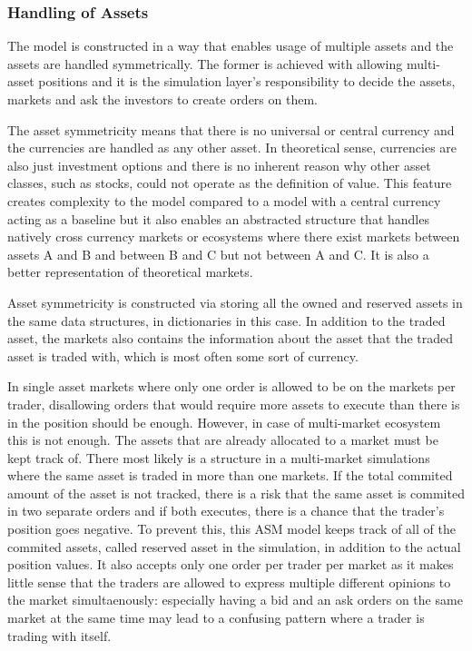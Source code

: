

\subsubsection{Handling of Assets}

The model is constructed in a way that enables usage of multiple assets
and the assets are handled symmetrically. The former is achieved with
allowing multi-asset positions and it is the simulation layer's 
responsibility to decide the assets, markets and ask the investors
to create orders on them.

The asset symmetricity means that there is no universal or central currency 
and the currencies are handled as any other asset. In theoretical sense, 
currencies are also just investment options and there is no inherent reason why other 
asset classes, such as stocks, could not operate as the definition 
of value. This feature creates complexity to the model compared to a model
with a central currency acting as a baseline but it also enables an
abstracted structure that handles natively cross currency
markets or ecosystems where there exist markets between assets A and 
B and between B and C but not between A and C. It is also a better 
representation of theoretical markets.

Asset symmetricity is constructed via storing all the owned and reserved
assets in the same data structures, in dictionaries in this case. In addition
to the traded asset, the markets also contains the information about the asset
that the traded asset is traded with, which is most often some sort of currency. 

In single asset markets where only one order is allowed to be on the markets
per trader, disallowing orders that would require more assets to execute
than there is in the position should be enough. However, in case of multi-market
ecosystem this is not enough. The assets that are already allocated to 
a market must be kept track of. There most likely is a structure in a multi-market
simulations where the same asset is traded in more than one markets. If the
total commited amount of the asset is not tracked, there is a risk that the
same asset is commited in two separate orders and if both executes,
there is a chance that the trader's position goes negative. To prevent this,
this ASM model keeps track of all of the commited assets, called reserved
asset in the simulation, in addition to the actual position values. It also
accepts only one order per trader per market as it makes little sense that
the traders are allowed to express multiple different opinions to the market 
simultaenously: especially having a bid and an ask orders on the same market
at the same time may lead to a confusing pattern where a trader is trading with
itself. 

